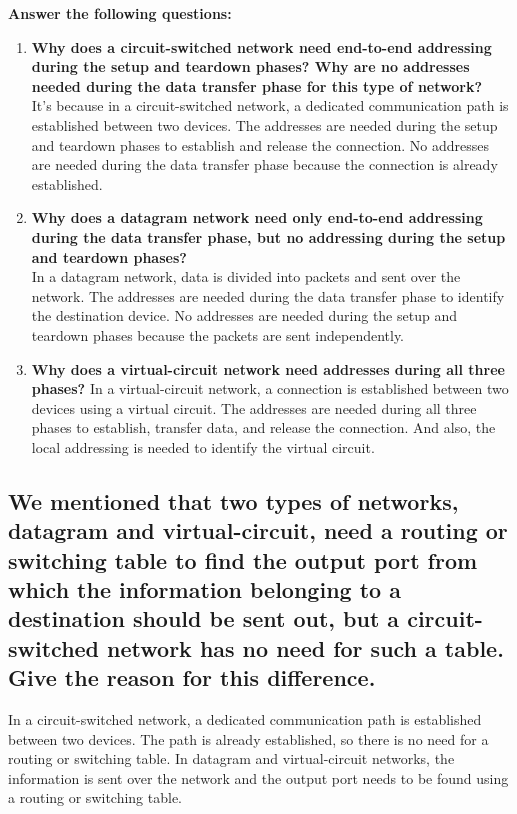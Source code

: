 \documentclass{article}
\begin{document}
\textbf{
	Answer the following questions:
}
\begin{enumerate}
	\item \textbf{ Why does a circuit-switched network need end-to-end addressing during the
		      setup and teardown phases? Why are no addresses needed during the data
		      transfer phase for this type of network? } \\
	      It's because in a circuit-switched network, a dedicated communication path is established between two devices. The addresses are needed during the setup and teardown phases to establish and release the connection. No addresses are needed during the data transfer phase because the connection is already established.

	\item \textbf{Why does a datagram network need only end-to-end addressing during the
		      data transfer phase, but no addressing during the setup and teardown phases? } \\
	      In a datagram network, data is divided into packets and sent over the network. The addresses are needed during the data transfer phase to identify the destination device. No addresses are needed during the setup and teardown phases because the packets are sent independently.

	\item \textbf{  Why does a virtual-circuit network need addresses during all three phases? }
	      In a virtual-circuit network, a connection is established between two devices using a virtual circuit. The addresses are needed during all three phases to establish, transfer data, and release the connection. And also, the local addressing is needed to identify the virtual circuit.
\end{enumerate}

\subsection{We mentioned that two types of networks, datagram and virtual-circuit, need a
	routing or switching table to find the output port from which the information
	belonging to a destination should be sent out, but a circuit-switched network
	has no need for such a table. Give the reason for this difference. }

In a circuit-switched network, a dedicated communication path is established between two devices. The path is already established, so there is no need for a routing or switching table. In datagram and virtual-circuit networks, the information is sent over the network and the output port needs to be found using a routing or switching table.
\end{document}
